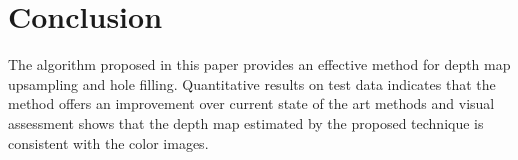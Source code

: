 

\section{Conclusion}
\label{sec:2.conclusion}

The algorithm proposed in this paper provides an effective method for depth map upsampling and hole filling. Quantitative results on test data indicates that the method offers an improvement over current state of the art methods and visual assessment shows that the depth map estimated by the proposed technique is consistent with the color images.



